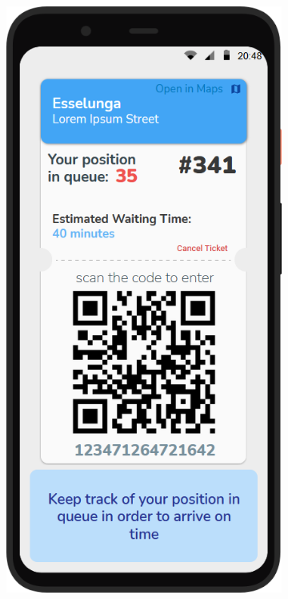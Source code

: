 \begin{figure}[H]
\begin{subfigure}{.33\textwidth}
        \label{fig:screen8}
    \end{subfigure}%
    \begin{subfigure}{.33\textwidth}
        \centering
        \includegraphics[width=.95\linewidth]{Images/screen_09.png}

\end{subfigure}
\end{figure}

